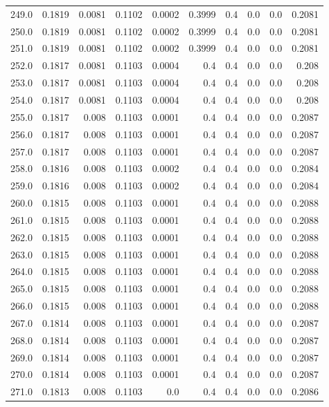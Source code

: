\begin{longtable}{lrrrrrrrrr}
249.0 & 0.1819 & 0.0081 & 0.1102 & 0.0002 & 0.3999 & 0.4 & 0.0 & 0.0 & 0.2081 \\
250.0 & 0.1819 & 0.0081 & 0.1102 & 0.0002 & 0.3999 & 0.4 & 0.0 & 0.0 & 0.2081 \\
251.0 & 0.1819 & 0.0081 & 0.1102 & 0.0002 & 0.3999 & 0.4 & 0.0 & 0.0 & 0.2081 \\
252.0 & 0.1817 & 0.0081 & 0.1103 & 0.0004 & 0.4 & 0.4 & 0.0 & 0.0 & 0.208 \\
253.0 & 0.1817 & 0.0081 & 0.1103 & 0.0004 & 0.4 & 0.4 & 0.0 & 0.0 & 0.208 \\
254.0 & 0.1817 & 0.0081 & 0.1103 & 0.0004 & 0.4 & 0.4 & 0.0 & 0.0 & 0.208 \\
255.0 & 0.1817 & 0.008 & 0.1103 & 0.0001 & 0.4 & 0.4 & 0.0 & 0.0 & 0.2087 \\
256.0 & 0.1817 & 0.008 & 0.1103 & 0.0001 & 0.4 & 0.4 & 0.0 & 0.0 & 0.2087 \\
257.0 & 0.1817 & 0.008 & 0.1103 & 0.0001 & 0.4 & 0.4 & 0.0 & 0.0 & 0.2087 \\
258.0 & 0.1816 & 0.008 & 0.1103 & 0.0002 & 0.4 & 0.4 & 0.0 & 0.0 & 0.2084 \\
259.0 & 0.1816 & 0.008 & 0.1103 & 0.0002 & 0.4 & 0.4 & 0.0 & 0.0 & 0.2084 \\
260.0 & 0.1815 & 0.008 & 0.1103 & 0.0001 & 0.4 & 0.4 & 0.0 & 0.0 & 0.2088 \\
261.0 & 0.1815 & 0.008 & 0.1103 & 0.0001 & 0.4 & 0.4 & 0.0 & 0.0 & 0.2088 \\
262.0 & 0.1815 & 0.008 & 0.1103 & 0.0001 & 0.4 & 0.4 & 0.0 & 0.0 & 0.2088 \\
263.0 & 0.1815 & 0.008 & 0.1103 & 0.0001 & 0.4 & 0.4 & 0.0 & 0.0 & 0.2088 \\
264.0 & 0.1815 & 0.008 & 0.1103 & 0.0001 & 0.4 & 0.4 & 0.0 & 0.0 & 0.2088 \\
265.0 & 0.1815 & 0.008 & 0.1103 & 0.0001 & 0.4 & 0.4 & 0.0 & 0.0 & 0.2088 \\
266.0 & 0.1815 & 0.008 & 0.1103 & 0.0001 & 0.4 & 0.4 & 0.0 & 0.0 & 0.2088 \\
267.0 & 0.1814 & 0.008 & 0.1103 & 0.0001 & 0.4 & 0.4 & 0.0 & 0.0 & 0.2087 \\
268.0 & 0.1814 & 0.008 & 0.1103 & 0.0001 & 0.4 & 0.4 & 0.0 & 0.0 & 0.2087 \\
269.0 & 0.1814 & 0.008 & 0.1103 & 0.0001 & 0.4 & 0.4 & 0.0 & 0.0 & 0.2087 \\
270.0 & 0.1814 & 0.008 & 0.1103 & 0.0001 & 0.4 & 0.4 & 0.0 & 0.0 & 0.2087 \\
271.0 & 0.1813 & 0.008 & 0.1103 & 0.0 & 0.4 & 0.4 & 0.0 & 0.0 & 0.2086 \\

\end{longtable}
